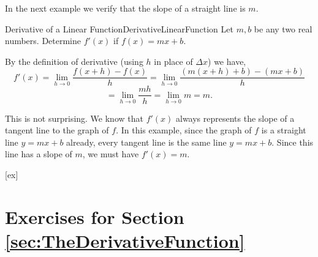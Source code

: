 In the next example we verify that the slope of a straight line is $m$.

\begin{example}{Derivative of a Linear Function}{DerivativeLinearFunction}
Let $m,b$ be any two real numbers.
Determine $f'(x)$ if $f(x)=mx+b$.
\end{example}

\begin{solution} 
By the definition of derivative (using $h$ in place of $\Delta x$) we have,
$$f'(x)=\lim_{h\to 0}\frac{f(x+h)-f(x)}{h}=\lim_{h\to 0}\frac{(m(x+h)+b)-(mx+b)}{h}$$
$$=\lim_{h\to 0}\frac{mh}{h}=\lim_{h\to 0}m=m.$$

This is not surprising. We know that $f'(x)$ always represents the slope of a tangent
line to the graph of $f$. In this example, since the graph of $f$ is a straight line $y=mx+b$
already, every tangent line is the same line $y=mx+b$. Since this line has a slope of $m$,
we must have $f'(x)=m$.
\end{solution}






[ex]
\section*{Exercises for Section \ref{sec:TheDerivativeFunction}}

